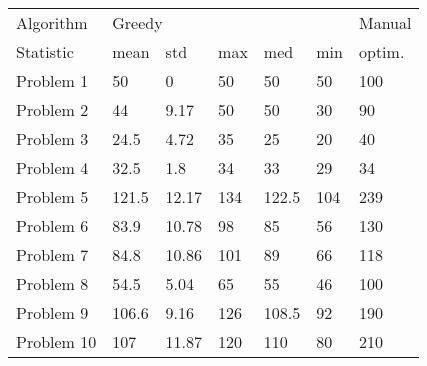 \begin{tabular}{lllllll}
\toprule
Algorithm & \multicolumn{5}{l}{Greedy} & Manual \\
Statistic &   mean &    std &  max &    med &  min & optim. \\
\midrule
Problem 1  &     50 &      0 &   50 &     50 &   50 &    100 \\
Problem 2  &     44 &   9.17 &   50 &     50 &   30 &     90 \\
Problem 3  &   24.5 &   4.72 &   35 &     25 &   20 &     40 \\
Problem 4  &   32.5 &    1.8 &   34 &     33 &   29 &     34 \\
Problem 5  &  121.5 &  12.17 &  134 &  122.5 &  104 &    239 \\
Problem 6  &   83.9 &  10.78 &   98 &     85 &   56 &    130 \\
Problem 7  &   84.8 &  10.86 &  101 &     89 &   66 &    118 \\
Problem 8  &   54.5 &   5.04 &   65 &     55 &   46 &    100 \\
Problem 9  &  106.6 &   9.16 &  126 &  108.5 &   92 &    190 \\
Problem 10 &    107 &  11.87 &  120 &    110 &   80 &    210 \\
\bottomrule
\end{tabular}
